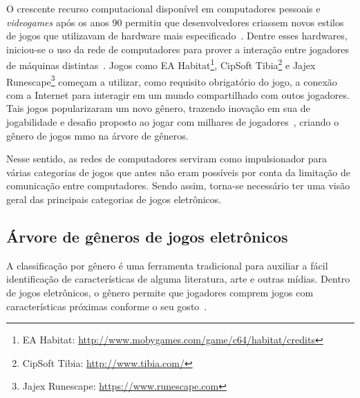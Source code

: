O crescente recurso computacional disponível em computadores pessoais e \textit{videogames} após os anos 90 permitiu que desenvolvedores criassem novos estilos de jogos que utilizavam de hardware mais especificado~\cite{adams_1208533}.
%
Dentre esses hardwares, iniciou-se o uso da rede de computadores para prover a interação entre jogadores de máquinas distintas~\cite{statisita_consumo_rede}.
%
Jogos como EA Habitat\footnote{EA Habitat: \url{http://www.mobygames.com/game/c64/habitat/credits}}, CipSoft Tibia\footnote{CipSoft Tibia: \url{http://www.tibia.com/}} e Jajex Runescape\footnote{Jajex Runescape: \url{https://www.runescape.com}} começam a utilizar, como requisito obrigatório do jogo, a conexão com a Internet para interagir em um mundo compartilhado com outos jogadores.
%
Tais jogos popularizaram um novo gênero, trazendo inovação em sua de jogabilidade e desafio proposto ao jogar com milhares de jogadores~\cite{guinness_runescape, 1417630}, criando o gênero de jogos \ac{mmo} na árvore de gêneros.



Nesse sentido, as redes de computadores serviram como impulsionador para várias categorias de jogos que antes não eram possíveis por conta da limitação de comunicação entre computadores.
%
Sendo assim, torna-se necessário ter uma visão geral das principais categorias de jogos eletrônicos.



\subsection{Árvore de gêneros de jogos eletrônicos}
\label{sec:arvore_generos}


A classificação por gênero é uma ferramenta tradicional para auxiliar a fácil identificação de características de alguma literatura, arte e outras mídias.
%
Dentro de jogos eletrônicos, o gênero permite que jogadores comprem jogos com características próximas conforme o seu gosto~\cite{Clarke2015}.



